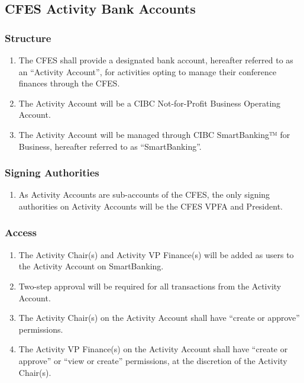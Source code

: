 \subsection{CFES Activity Bank Accounts}
\label{cfes-activity-bank-accounts}

\subsubsection{Structure}
\label{structure-1}

\begin{enumerate}
 \item
  The CFES shall provide a designated bank account, hereafter referred to as an “Activity Account”, for activities opting to manage their conference finances through the CFES.
 \item
  The Activity Account will be a CIBC Not-for-Profit Business Operating Account.
 \item
  The Activity Account will be managed through CIBC SmartBanking™ for Business, hereafter referred to as “SmartBanking”.
\end{enumerate}

\subsubsection{Signing Authorities}
\label{signing-authorities-1}

\begin{enumerate}
 \item
  As Activity Accounts are sub-accounts of the CFES, the only signing authorities on Activity Accounts will be the CFES VPFA and President.
\end{enumerate}

\subsubsection{Access}
\label{access}

\begin{enumerate}
 \item
  The Activity Chair(s) and Activity VP Finance(s) will be added as users to the Activity Account on SmartBanking.
 \item
  Two-step approval will be required for all transactions from the Activity Account.
 \item
  The Activity Chair(s) on the Activity Account shall have “create or approve” permissions.
 \item
  The Activity VP Finance(s) on the Activity Account shall have “create or approve” or “view or create” permissions, at the discretion of the Activity Chair(s).
\end{enumerate}

